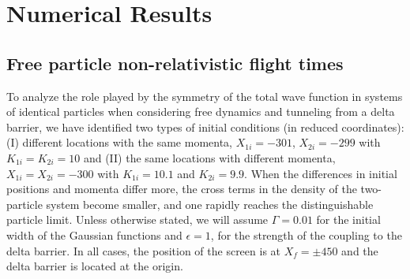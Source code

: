 \documentclass[preprint,aps]{revtex4}
\begin{document}
\renewcommand{\theequation}{5.\arabic{equation}} \setcounter{section}{4} %
\setcounter{equation}{0}
\section{Numerical Results}

\subsection{Free particle non-relativistic flight times}


To analyze the role played by the symmetry of the total wave function in systems of identical particles when considering free dynamics 
and tunneling from a delta barrier, we have identified two types of initial conditions (in reduced coordinates): (I) different locations with the same 
momenta, $X_{1i}=-301$, $X_{2i}= -299$ with $K_{1i}=K_{2i}=10$  and (II) the same locations with different momenta, $X_{1i}=X_{2i}= -300$ 
with $K_{1i}=10.1$ and $K_{2i}=9.9$. When the differences in initial positions 
and momenta differ more, the cross terms in the density of the two-particle system become smaller, and one rapidly reaches the 
distinguishable particle limit. Unless otherwise stated, we will assume $\Gamma = 0.01$ for the initial width of the Gaussian functions and
$\epsilon = 1$, for the strength of the coupling to the delta barrier. In all cases, the position of the screen is at $X_f= \pm 450$ and the delta barrier is located
at the origin.
\end{document}
